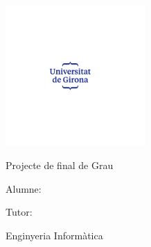 
\begin{titlepage}
    \centering
    \includegraphics[width=0.4\textwidth, trim = 63mm 79mm 78mm 79mm, clip]{UdG_dues_linies_centrat_blau.pdf}\par
    \vspace{1.5cm} %
    
    \LARGE
    Projecte de final de Grau
    \vspace{1.5cm}
    
    \titol
    \vspace{2.5cm}


    
    \Large
    Alumne: \autortesi
    
    Tutor: \tutortesi

    \vspace{2cm}
    
    Enginyeria Informàtica     \anydediposit
    
    \vspace{1.5cm}

    \vfill
\end{titlepage}